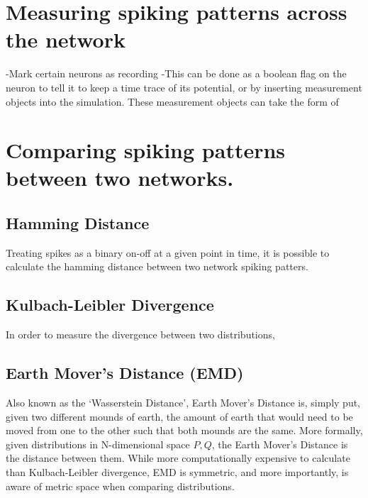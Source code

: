 \section{Measuring spiking patterns across the network}

-Mark certain neurons as recording
-This can be done as a boolean flag on the neuron to tell it to keep a time
trace of its potential, or by inserting measurement objects into the simulation.
These measurement objects can take the form of 

\section{Comparing spiking patterns between two networks.}

\subsection{Hamming Distance}
Treating spikes as a binary on-off at a given point in time, it is possible to
calculate the hamming distance between two network spiking patters. 

\subsection{Kulbach-Leibler Divergence}

In order to measure the divergence between two distributions, 

\subsection{Earth Mover's Distance (EMD)}

Also known as the `Wasserstein Distance', Earth Mover's Distance is, simply put,
given two different mounds of earth, the amount of earth that would need to be
moved from one to the other such that both mounds are the same. More formally,
given distributions in N-dimensional space $P, Q$, the Earth Mover's Distance is
the distance between them. While more computationally expensive to calculate
than Kulbach-Leibler divergence, EMD is symmetric, and more importantly, is
aware of metric space when comparing distributions. 

